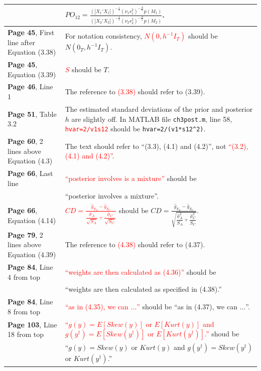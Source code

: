 \documentclass[10pt, a4paper]{article}
\newcommand{\red}[1]{\textcolor{red}{#1}}
\newcommand{\green}[1]{\textcolor{green!50!black}{#1}}
\begin{document}
\begin{longtable}{|R{.38\textwidth}|R{.58\textwidth}|}
	& \green{$\displaystyle PO_{12}=\frac{(|X_1'X_1|)^{-\frac{1}{2}}(\nu_1s_1^2)^{-\frac{N}{2}}p(M_1)}{(|X_2'X_2|)^{-\frac{1}{2}}(\nu_2s_2^2)^{-\frac{N}{2}}p(M_2)}$}. \\ \hline
	\textbf{Page 45}, First line after Equation (3.38) & For notation consistency, \red{$N(0,h^{-1}I_T)$} should be \green{$N(0_T,h^{-1}I_T)$}. \\ \hline	
	\textbf{Page 45}, Equation (3.39) & \red{$S$} should be \green{$T$}. \\ \hline	
	\textbf{Page 46}, Line 1 & The reference to \red{(3.38)} should refer to \green{(3.39)}. \\ \hline	
	\textbf{Page 51}, Table 3.2 & The estimated standard deviations of the prior and posterior $h$ are slightly off. In MATLAB file \texttt{ch3post.m}, line 58, \red{\texttt{hvar=2/v1s12}} should be \green{\texttt{hvar=2/(v1*s12\textasciicircum2)}}. \\ \hline	
	\textbf{Page 60}, 2 lines above Equation (4.3) & The text should refer to \green{``(3.3), (4.1) and (4.2)''}, not \red{``(3.2), (4.1) and (4.2)''}. \\ \hline
	\textbf{Page 66}, Last line & \red{``posterior involves is a mixture''} should be \\
	& \green{``posterior involves a mixture''}. \\ \hline	
	\textbf{Page 66}, Equation (4.14) & \red{$\displaystyle CD=\frac{\widehat{g}_{S_A}-\widehat{g}_{S_C}}{\dfrac{\widehat{\sigma}_A}{\sqrt{S_A}}+\dfrac{\widehat{\sigma}_C}{\sqrt{S_C}}}$} should be \green{$\displaystyle CD=\frac{\widehat{g}_{S_A}-\widehat{g}_{S_C}}{\sqrt{\dfrac{\widehat{\sigma}_A^2}{S_A}+\dfrac{\widehat{\sigma}_C^2}{S_C}}}$}. \\ \hline	
	\textbf{Page 79}, 2 lines above Equation (4.39) & The reference to \red{(4.38)} should refer to \green{(4.37)}. \\ \hline	
	\textbf{Page 84}, Line 4 from top & \red{``weights are then calculated as (4.36)''}  should be \\
	& \green{``weights are then calculated as specified in (4.38).''} \\ \hline	
	\textbf{Page 84}, Line 8 from top &  \red{``as in (4.35), we can $\ldots$''} should  be \green{``as in (4.37), we can $\ldots$''}. \\ \hline	
	\textbf{Page 103}, Line 18 from top & \red{``$g(y)=E[Skew(y)]$ or $E[Kurt(y)]$ and $g(y^\dagger)=E[Skew(y^\dagger)]$ or $E[Kurt(y^\dagger)]$.''}  shoud be \\
	& \green{``$g(y)=Skew(y)$ or $Kurt(y)$ and $g(y^\dagger)=Skew(y^\dagger)$ or $Kurt(y^\dagger)$.''} \\ \hline	

\end{longtable}
\end{document}
